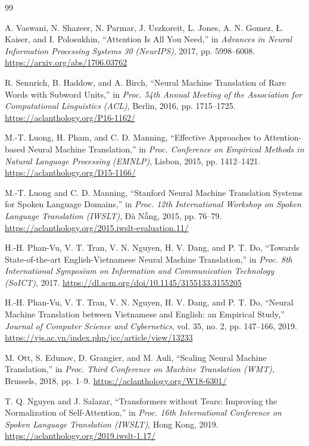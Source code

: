 \documentclass[11pt,a4paper]{article}
\begin{document}
\begin{thebibliography}{99}
\small

A. Vaswani, N. Shazeer, N. Parmar, J. Uszkoreit, L. Jones, A. N. Gomez,
Ł. Kaiser, and I. Polosukhin, ``Attention Is All You Need,'' in
\emph{Advances in Neural Information Processing Systems 30 (NeurIPS)}, 2017,
pp. 5998--6008. \url{https://arxiv.org/abs/1706.03762}

R. Sennrich, B. Haddow, and A. Birch, ``Neural Machine Translation of Rare Words
with Subword Units,'' in \emph{Proc. 54th Annual Meeting of the Association for
Computational Linguistics (ACL)}, Berlin, 2016, pp. 1715--1725.
\url{https://aclanthology.org/P16-1162/}

M.-T. Luong, H. Pham, and C. D. Manning, ``Effective Approaches to
Attention-based Neural Machine Translation,'' in \emph{Proc. Conference on
Empirical Methods in Natural Language Processing (EMNLP)}, Lisbon, 2015,
pp. 1412--1421. \url{https://aclanthology.org/D15-1166/}

M.-T. Luong and C. D. Manning, ``Stanford Neural Machine Translation Systems for
Spoken Language Domains,'' in \emph{Proc. 12th International Workshop on Spoken
Language Translation (IWSLT)}, Đà Nẵng, 2015, pp. 76--79.
\url{https://aclanthology.org/2015.iwslt-evaluation.11/}

H.-H. Phan-Vu, V. T. Tran, V. N. Nguyen, H. V. Dang, and P. T. Do, ``Towards
State-of-the-art English-Vietnamese Neural Machine Translation,'' in \emph{Proc.
8th International Symposium on Information and Communication Technology
(SoICT)}, 2017. \url{https://dl.acm.org/doi/10.1145/3155133.3155205}

H.-H. Phan-Vu, V. T. Tran, V. N. Nguyen, H. V. Dang, and P. T. Do, ``Neural
Machine Translation between Vietnamese and English: an Empirical Study,''
\emph{Journal of Computer Science and Cybernetics}, vol. 35, no. 2,
pp. 147--166, 2019. \url{https://vjs.ac.vn/index.php/jcc/article/view/13233}

M. Ott, S. Edunov, D. Grangier, and M. Auli, ``Scaling Neural Machine
Translation,'' in \emph{Proc. Third Conference on Machine Translation (WMT)},
Brussels, 2018, pp. 1--9. \url{https://aclanthology.org/W18-6301/}

T. Q. Nguyen and J. Salazar, ``Transformers without Tears: Improving the
Normalization of Self-Attention,'' in \emph{Proc. 16th International Conference
on Spoken Language Translation (IWSLT)}, Hong Kong, 2019.
\url{https://aclanthology.org/2019.iwslt-1.17/}


\end{thebibliography}
\end{document}
